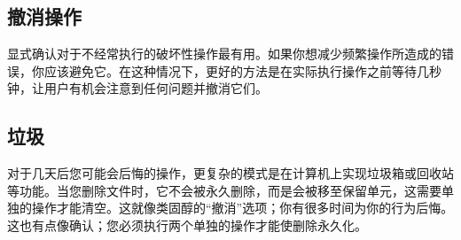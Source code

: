 \subsection{撤消操作}
显式确认对于不经常执行的破坏性操作最有用。如果你想减少频繁操作所造成的错误，你应该避免它。在这种情况下，更好的方法是在实际执行操作之前等待几秒钟，让用户有机会注意到任何问题并撤消它们。

\subsection{垃圾}
对于几天后您可能会后悔的操作，更复杂的模式是在计算机上实现垃圾箱或回收站等功能。当您删除文件时，它不会被永久删除，而是会被移至保留单元，这需要单独的操作才能清空。这就像类固醇的“撤消”选项；你有很多时间为你的行为后悔。这也有点像确认；您必须执行两个单独的操作才能使删除永久化。